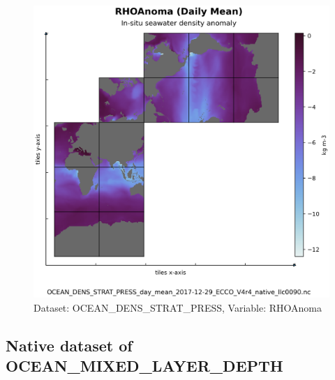 \begin{figure}[H]
\centering
\includegraphics[scale=0.55]{../images/plots/native_plots/Ocean_Density_Stratification_and_Hydrostatic_Pressure/RHOAnoma.png}
\caption{Dataset: OCEAN\_DENS\_STRAT\_PRESS, Variable: RHOAnoma}
\label{tab:table-OCEAN_DENS_STRAT_PRESS_RHOAnoma-Plot}
\end{figure}
\subsection{Native dataset of OCEAN\_MIXED\_LAYER\_DEPTH}
\newp
